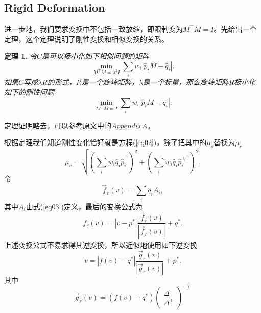 \documentclass[12pt]{article}
\newtheorem{theorem}{\hspace{2em}定理}
\begin{document}
\subsection{Rigid Deformation}
进一步地，我们要求变换中不包括一致放缩，即限制变为$M^{\top}M=I$。先给出一个定理，这个定理说明了刚性变换和相似变换的关系。
\begin{theorem}
	令$C$是可以极小化如下相似问题的矩阵
	\begin{equation*}
		\min_{M^{\top}M=\lambda^2I}\sum_iw_i\left|\hat{p}_iM-\hat{q}_i\right|.
	\end{equation*}
	如果$C$写成$\lambda R$的形式，$R$是一个旋转矩阵，$\lambda$是一个标量，那么旋转矩阵$R$极小化如下的刚性问题
	\begin{equation*}
		\min_{M^{\top}M=I}\sum_iw_i\left|\hat{p}_iM-\hat{q}_i\right|.
	\end{equation*}
\end{theorem}
定理证明略去，可以参考原文中的$Appendix A$。

根据定理我们知道刚性变化恰好就是方程(\ref{eq02})，除了把其中的$\mu_s$替换为$\mu_r$
\begin{equation*}
	\mu_r = \sqrt{\left(\sum_iw_i\hat{q}_i\hat{p}_i^{\top}\right)^2 + \left(\sum_iw_i\hat{q}_i\hat{p}_i^{\bot\top}\right)^2}.
\end{equation*}
令
\begin{equation*}
	\overrightarrow{f}_r(v)=\sum_i\hat{q}_iA_i,
\end{equation*}
其中$A_i$由式(\ref{eq03})定义，最后的变换公式为
\begin{equation}
	f_r(v)  = \left|v-p^*\right|\frac{\overrightarrow{f}_r(v)}{\left|\overrightarrow{f}_r(v)\right|} + q^*.
\end{equation}
上述变换公式不易求得其逆变换，所以近似地使用如下逆变换
\begin{equation*}
	v  = \left|f(v)-q^*\right|\frac{\overrightarrow{g}_r(v)}{\left|\overrightarrow{g}_r(v)\right|} + p^*.
\end{equation*}
其中
\begin{equation*}
	\overrightarrow{g}_r(v) = (f(v)-q^*)\left(\begin{matrix}	\Delta \\ \Delta^{\bot}	\end{matrix}\right)^{-\top}
\end{equation*}
\end{document}
